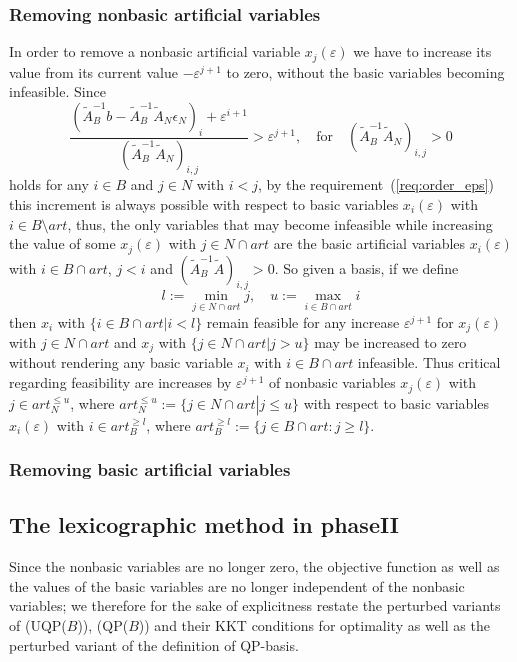 \documentclass[a4paper]{article}
\begin{document}
\subsubsection{Removing nonbasic artificial variables}
In order to remove a nonbasic artificial variable $x_{j}(\varepsilon)$ we
have to increase its value from its current value $-\varepsilon^{j+1}$ to zero,
without the basic variables becoming infeasible.
Since
\begin{equation*} 
\frac{
  \left(
    \tilde{A}_{B}^{-1}b-\tilde{A}_{B}^{-1}\tilde{A}_{N}\epsilon_{N}
  \right)_{i}
  + \varepsilon^{i+1}
}
{\left(\tilde{A}_{B}^{-1}\tilde{A}_{N}\right)_{i, j}}
> 
\varepsilon^{j+1},
\quad \text{for} \quad \left(\tilde{A}_{B}^{-1}\tilde{A}_{N}\right)_{i, j} >0
\end{equation*}
holds for any $i \in B$ and $j \in N$ with $i < j$,
by the requirement~(\ref{req:order_eps}) this increment is always possible
with respect to basic variables $x_{i}(\varepsilon)$ with
$i \in B \setminus art$, thus, the only variables
that may become infeasible while increasing the value of some
$x_{j}(\varepsilon)$ with $j \in N \cap art$ are the basic artificial variables
$x_{i}(\varepsilon)$ with $i \in B \cap art$, $j<i$ and
$(\tilde{A}_{B}^{-1}\tilde{A})_{i,j} >0$. So given a basis, if we define
\begin{equation}
l:=\min_{j \in N \cap art}j, \quad u:=\max_{i \in B \cap art}i
\end{equation}
then $x_{i}$ with $\{i \in B \cap art\left|\right. i < l\}$ remain feasible for
any increase $\varepsilon^{j+1}$ for $x_{j}(\varepsilon)$ with
$j \in N \cap art$ and $x_{j}$ with $\{j \in N \cap art\left|\right. j > u\}$
may be increased to zero without rendering any basic variable
$x_{i}$ with $i \in B \cap art$ infeasible. Thus critical regarding
feasibility are increases by $\varepsilon^{j+1}$ of nonbasic variables
$x_{j}(\varepsilon)$ with $j \in art_{N}^{\leq u}$, where
$art_{N}^{\leq u}:= \{j \in N \cap art\left|\right. j \leq u\}$
with respect to basic variables $x_{i}(\varepsilon)$ with
$i \in art_{B}^{\geq l}$, where
$art_{B}^{\geq l}:=\{j \in B \cap art: j \geq l\}$.
\subsubsection{Removing basic artificial variables}

\subsection{The lexicographic method in phaseII}
Since the nonbasic variables are no longer zero, the objective function as well as
the values of the basic variables are no longer independent of the nonbasic
variables; we therefore for the sake of explicitness restate the perturbed
variants of (UQP($B$)), (QP($B$)) and their KKT conditions for optimality
as well as the perturbed variant of the definition of QP-basis.
\end{document}
